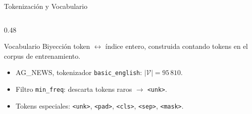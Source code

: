 \documentclass[aspectratio=169, 10pt]{beamer}
\newcommand{\V}{\mathcal{V}}
\newcommand{\tok}[1]{\texttt{#1}}
\begin{document}
\begin{frame}{Tokenizaci\'on y Vocabulario}
\begin{columns}[T]
		\begin{column}{0.48\textwidth}
			\begin{block}{Vocabulario}
				\small
				Biyecci\'on token $\leftrightarrow$ \'indice entero, construida contando tokens en el corpus de entrenamiento.
				\begin{itemize}
					\item AG\_NEWS, tokenizador \texttt{basic\_english}: $|\V| = 95\,810$.
					\item Filtro \texttt{min\_freq}: descarta tokens raros $\to$ \tok{<unk>}.
					\item Tokens especiales: \tok{<unk>}, \tok{<pad>}, \tok{<cls>}, \tok{<sep>}, \tok{<mask>}.
				\end{itemize}
			\end{block}
		\end{column}
	\end{columns}

\end{frame}
\end{document}
